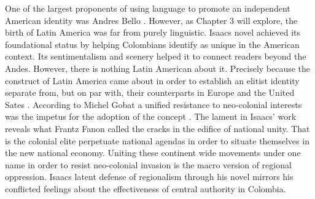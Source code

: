 One of the largest proponents of using language to promote an independent American identity was Andres Bello \autocite[1350]{Gobat2013}. However, as Chapter 3 will explore, the birth of Latin America was far from purely linguistic. Isaacs novel achieved its foundational status by helping Colombians identify as unique in the American context.  Its sentimentalism and scenery helped it to connect readers beyond the Andes. However, there is nothing Latin American about it. Precisely because the construct of Latin America came about in order to establish an elitist identity separate from, but on par with, their counterparts in Europe and the United Sates \autocite[1349]{Gobat2013}. According to Michel Gobat a unified resistance to neo-colonial interests was the impetus for the adoption of the concept \autocite[1349]{Gobat2013}. The lament in Isaacs' work reveals what Frantz Fanon called the cracks in the edifice of national unity. That is the colonial elite perpetuate national agendas in order to situate themselves in the new national economy. Uniting these continent wide movements under one name in order to resist neo-colonial invasion is the macro version of regional oppression. Isaacs latent defense of regionalism through his novel mirrors his conflicted feelings about the effectiveness of central authority in Colombia. 



